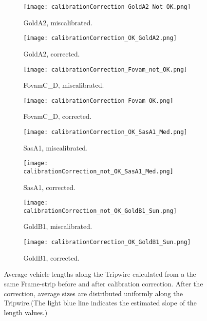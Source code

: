 \clearpage
\addtolength{\topmargin}{-.6in}
\begin{figure}[p]
	\thispagestyle{empty}
	\centering
	\begin{subfigure}[t]{0.36\textwidth}
		\texttt{[image: calibrationCorrection\_GoldA2\_Not\_OK.png]}
		\caption{GoldA2, miscalibrated.}
	\end{subfigure}
	\quad
	\begin{subfigure}[t]{0.36\textwidth}
		\texttt{[image: calibrationCorrection\_OK\_GoldA2.png]}
		\caption{GoldA2, corrected.}
	\end{subfigure}
	\hfill
	\begin{subfigure}[t]{0.36\textwidth}
		\texttt{[image: calibrationCorrection\_Fovam\_not\_OK.png]}
		\caption{FovamC\_D, miscalibrated.}
	\end{subfigure}
	\quad
	\begin{subfigure}[t]{0.36\textwidth}
		\texttt{[image: calibrationCorrection\_Fovam\_OK.png]}
		\caption{FovamC\_D, corrected.}
	\end{subfigure}
\hfill
\begin{subfigure}[t]{0.36\textwidth}
	\texttt{[image: calibrationCorrection\_OK\_SasA1\_Med.png]}
	\caption{SasA1, miscalibrated.}
\end{subfigure}
\quad
\begin{subfigure}[t]{0.36\textwidth}
	\texttt{[image: calibrationCorrection\_not\_OK\_SasA1\_Med.png]}
	\caption{SasA1, corrected.}
\end{subfigure}
\hfill
\begin{subfigure}[t]{0.36\textwidth}
	\texttt{[image: calibrationCorrection\_not\_OK\_GoldB1\_Sun.png]}
	\caption{GoldB1, miscalibrated.}
\end{subfigure}
\quad
\begin{subfigure}[t]{0.36\textwidth}
	\texttt{[image: calibrationCorrection\_OK\_GoldB1\_Sun.png]}
	\caption{GoldB1, corrected.}
\end{subfigure}
	\caption[Average vehicl lengths along the Tripwire before and after calibration correction]{Average vehicle lengths along the Tripwire calculated from a the same Frame-strip before and after calibration correction. After the correction, average sizes are distributed uniformly along the Tripwire.(The light blue line indicates the estimated slope of the length values.)\label{fig:calibrations2}}
\end{figure}

